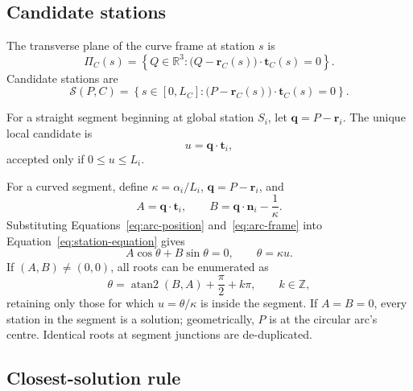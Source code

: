 \documentclass[11pt,a4paper]{article}
\newcommand{\R}{\mathbb{R}}
\begin{document}
\subsection{Candidate stations}

The transverse plane of the curve frame at station $s$ is
\begin{equation}
  \Pi_C(s)=
  \left\{Q\in\R^3:\big(Q-\mathbf{r}_C(s)\big)
  \cdot\mathbf{t}_C(s)=0\right\}.
\end{equation}
Candidate stations are
\begin{equation}
  \mathcal{S}(P,C)=
  \left\{s\in[0,L_C]:
  \big(P-\mathbf{r}_C(s)\big)\cdot\mathbf{t}_C(s)=0\right\}.
  \label{eq:station-equation}
\end{equation}

For a straight segment beginning at global station $S_i$, let
$\mathbf{q}=P-\mathbf{r}_i$.  The unique local candidate is
\begin{equation}
  u=\mathbf{q}\cdot\mathbf{t}_i,
  \label{eq:straight-station-root}
\end{equation}
accepted only if $0\le u\le L_i$.

For a curved segment, define $\kappa=\alpha_i/L_i$,
$\mathbf{q}=P-\mathbf{r}_i$, and
\begin{equation}
  A=\mathbf{q}\cdot\mathbf{t}_i,
  \qquad
  B=\mathbf{q}\cdot\mathbf{n}_i-\frac{1}{\kappa}.
\end{equation}
Substituting Equations~\eqref{eq:arc-position} and~\eqref{eq:arc-frame} into
Equation~\eqref{eq:station-equation} gives
\begin{equation}
  A\cos\theta+B\sin\theta=0,
  \qquad \theta=\kappa u.
  \label{eq:arc-station-root}
\end{equation}
If $(A,B)\ne(0,0)$, all roots can be enumerated as
\begin{equation}
  \theta=\operatorname{atan2}(B,A)+\frac{\pi}{2}+k\pi,
  \qquad k\in\mathbb{Z},
  \label{eq:arc-root-enumeration}
\end{equation}
retaining only those for which $u=\theta/\kappa$ is inside the segment.  If
$A=B=0$, every station in the segment is a solution; geometrically, $P$ is at
the circular arc's centre.  Identical roots at segment junctions are
de-duplicated.

\subsection{Closest-solution rule}
\end{document}
